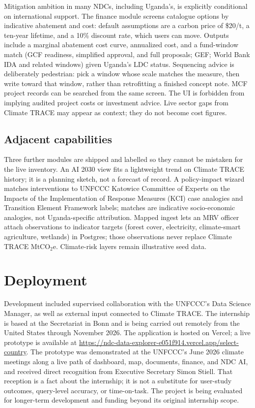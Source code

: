 \documentclass{article}
\begin{document}
Mitigation ambition in many NDCs, including Uganda's, is explicitly conditional on international support. The finance module screens catalogue options by indicative abatement and cost: default assumptions are a carbon price of \$20/t, a ten-year lifetime, and a 10\% discount rate, which users can move. Outputs include a marginal abatement cost curve, annualized cost, and a fund-window match (GCF readiness, simplified approval, and full proposals; GEF; World Bank IDA and related windows) given Uganda's LDC status. Sequencing advice is deliberately pedestrian: pick a window whose scale matches the measure, then write toward that window, rather than retrofitting a finished concept note. MCF project records can be searched from the same screen. The UI is forbidden from implying audited project costs or investment advice. Live sector gaps from Climate TRACE may appear as context; they do not become cost figures.

\subsection{Adjacent capabilities}
\label{sec:adjacent}

Three further modules are shipped and labelled so they cannot be mistaken for the live inventory. An AI 2030 view fits a lightweight trend on Climate TRACE history; it is a planning sketch, not a forecast of record. A policy-impact wizard matches interventions to UNFCCC Katowice Committee of Experts on the Impacts of the Implementation of Response Measures (KCI) case analogies and Transition Element Framework labels; matches are indicative socio-economic analogies, not Uganda-specific attribution. Mapped ingest lets an MRV officer attach observations to indicator targets (forest cover, electricity, climate-smart agriculture, wetlands) in Postgres; those observations never replace Climate TRACE MtCO$_2$e. Climate-risk layers remain illustrative seed data.

\section{Deployment}
\label{sec:deployment}

Development included supervised collaboration with the UNFCCC's Data Science Manager, as well as external input connected to Climate TRACE. The internship is based at the Secretariat in Bonn and is being carried out remotely from the United States through November 2026. The application is hosted on Vercel; a live prototype is available at \url{https://ndc-data-explorer-e051f914.vercel.app/select-country}. The prototype was demonstrated at the UNFCCC's June 2026 climate meetings along a live path of dashboard, map, documents, finance, and NDC AI, and received direct recognition from Executive Secretary Simon Stiell. That reception is a fact about the internship; it is not a substitute for user-study outcomes, query-level accuracy, or time-on-task. The project is being evaluated for longer-term development and funding beyond its original internship scope.
\end{document}
